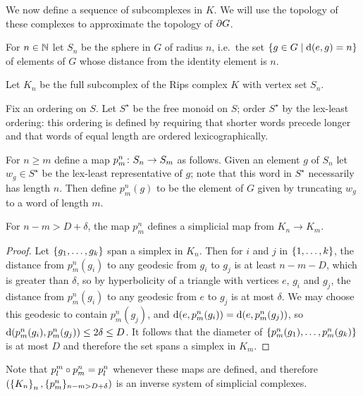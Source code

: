 \documentclass[a4paper]{article}
\begin{document}
We now define a sequence of subcomplexes in $K$. We will use the topology of
these complexes to approximate the topology of $\partial G$. 

\begin{definition}
  For $n \in \mathbb{N}$ let $S_n$ be the sphere in $G$ of radius $n$, i.e.\ the 
  set $\left\{g \in G \mid \operatorname{d}(e, g) = n\right\}$ of elements of $G$ whose 
  distance from the identity element is $n$. 

  Let $K_n$ be the full subcomplex of the Rips complex $K$ with vertex set
  $S_n$.
\end{definition}

\begin{definition}
  Fix an ordering on $S$. Let $S^\star$ be the free monoid on 
  $S$; order $S^\star$ by the lex-least ordering: this ordering is defined by 
  requiring that shorter words precede longer and that words of equal length are 
  ordered lexicographically. 

  For $n \geq m$ define a map $p^n_m \colon S_n \to S_m$ as follows.
  Given an element $g$ of $S_n$ let $w_g \in S^\star$ be the lex-least
  representative of $g$; note that this word in $S^\star$ necessarily has
  length $n$.  Then define $p^n_m(g)$ to be the element of $G$ given by
  truncating $w_g$ to a word of length $m$.
\end{definition}

\begin{lemma}\label{lem:psimplicial}
  For $n - m > D + \delta$, the map $p^n_m$ defines a simplicial map from
  $K_n \to K_m$.
\end{lemma}

\begin{proof}
  Let $\left\{g_1, \dotsc, g_k\right\}$ span a simplex in $K_n$.  Then for $i$ and
  $j$ in $\left\{1, \dotsc, k\right\}$, the distance from $p^n_m(g_i)$ to any
  geodesic from $g_i$ to $g_j$ is at least $n - m - D$, which is greater than
  $\delta$, so by hyperbolicity of a triangle with vertices $e$, $g_i$ and $g_j$,
  the distance from $p^n_m(g_i)$ to any geodesic from $e$ to $g_j$ is at most
  $\delta$. We may choose this geodesic to contain $p^n_m(g_j)$, and $\operatorname{d}(e,
  p^n_m(g_i)) = \operatorname{d}(e, p^n_m(g_j))$, so $\operatorname{d}(p^n_m(g_i), p^n_m(g_j)) \leq
  2\delta \leq D$.  It follows that the diameter of $\left\{p^n_m(g_1), \dotsc,
  p^n_m(g_k)\right\}$ is at most $D$ and therefore the set spans a simplex in $K_m$.
\end{proof}

\begin{remark}
  Note that $p^m_l \circ p^n_m = p^n_l$ whenever these maps are defined, and 
  therefore $(\left\{K_n\right\}_n, \{p^n_m\}_{n - m > D + \delta})$ is an inverse system 
  of simplicial complexes.
\end{remark}
\end{document}
